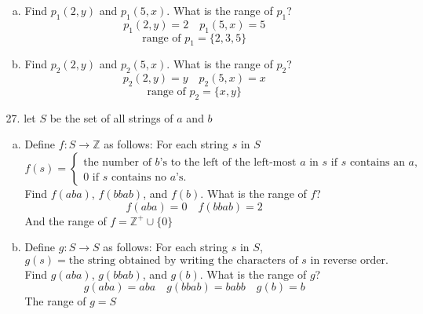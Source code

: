 \documentclass[12pt]{article}
\newcommand{\Z}{\mathbb{Z}}
\newcommand{\nonneg}{\Z^+ \cup \{0\}}
\begin{document}
\begin{enumerate}
\begin{enumerate}
            \begin{enumerate}[a.]
                \item Find $p_1(2, y)$ and $p_1(5, x)$. What is the range of $p_1$?
                    \[
                    p_1(2,y)=2 \quad p_1(5,x) = 5
                    \]
                    \[
                    \text{range of }p_1 = \{2,3,5\}
                    \]
                
                \item Find $p_2(2, y)$ and $p_2(5, x)$. What is the range of $p_2$?
                    \[
                    p_2(2,y) = y \quad p_2(5,x) = x
                    \]
                    \[
                    \text{range of }p_2 = \{x,y\}
                    \]

                    

                
            \end{enumerate}

        \item[27.] let $S$ be the set of all strings of $a$ and $b$
            \begin{enumerate}[a.]
            
            
                \item Define $f: S \to \mathbb{Z}$ as follows: For each string $s$ in $S$
                    \[
                    f(s) = 
                    \begin{cases}
                    \text{the number of $b$'s to the left of the left-most $a$ in $s$}  \text{ if } s \text{ contains an } a, \\
                    0  \text{ if } s \text{ contains no } a\text{'s}.
                    \end{cases}
                    \]
                    Find $f(aba)$, $f(bbab)$, and $f(b)$. What is the range of $f$?
                    \[
                    f(aba) = 0\quad f(bbab) = 2
                    \]
                    And the range of $f=\nonneg$
                    \item Define $g: S \to S$ as follows: For each string $s$ in $S$,
                    \[
                    g(s) = \text{the string obtained by writing the characters of } s \text{ in reverse order.}
                    \]
                    Find $g(aba)$, $g(bbab)$, and $g(b)$. What is the range of $g$?
                    \[
                    g(aba) = aba \quad g(bbab) = babb \quad g(b) = b
                    \]
                    The range of $g = S$
        

\end{enumerate}
\end{enumerate}
\end{enumerate}
\end{document}
